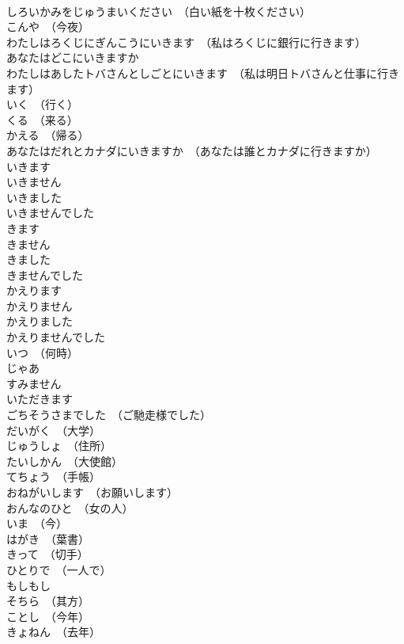 \documentclass[8pt]{extreport}
\begin{document}
\begin{CJK}{UTF8}{min}
\\	しろいかみをじゅうまいください　（白い紙を十枚ください）	
\\	こんや　（今夜）	
\\	わたしはろくじにぎんこうにいきます　（私はろくじに銀行に行きます）	
\\	あなたはどこにいきますか	
\\	わたしはあしたトバさんとしごとにいきます　（私は明日トバさんと仕事に行きます）	
\\	いく　（行く）	
\\	くる　（来る）	
\\	かえる　（帰る）	
\\	あなたはだれとカナダにいきますか　（あなたは誰とカナダに行きますか）	
\\	いきます	
\\	いきません	
\\	いきました	
\\	いきませんでした	
\\	きます	
\\	きません	
\\	きました	
\\	きませんでした	
\\	かえります	
\\	かえりません	
\\	かえりました	
\\	かえりませんでした	
\\	いつ　（何時）	
\\	じゃあ	
\\	すみません	
\\	いただきます	
\\	ごちそうさまでした　（ご馳走様でした）	
\\	だいがく　（大学）	
\\	じゅうしょ　（住所）	
\\	たいしかん　（大使館）	
\\	てちょう　（手帳）	
\\	おねがいします　（お願いします）	
\\	おんなのひと　（女の人）	
\\	いま　（今）	
\\	はがき　（葉書）	
\\	きって　（切手）	
\\	ひとりで　（一人で）	
\\	もしもし	
\\	そちら　（其方）	
\\	ことし　（今年）	
\\	きょねん　（去年）	

\end{CJK}
\end{document}
